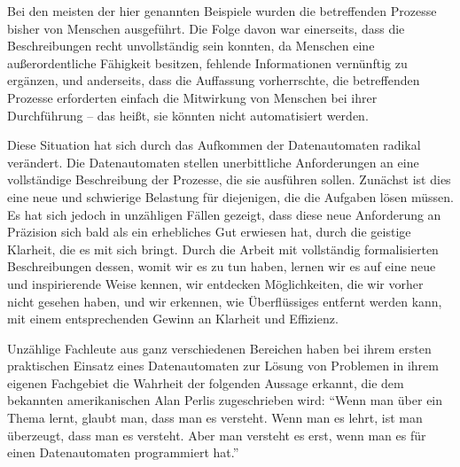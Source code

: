 {Bei den meisten der hier genannten Beispiele wurden die betreffenden Prozesse bisher von Menschen ausgeführt. Die Folge davon war einerseits, dass die Beschreibungen recht unvollständig sein konnten, da Menschen eine außerordentliche Fähigkeit besitzen, fehlende Informationen vernünftig zu ergänzen, und anderseits, dass die Auffassung vorherrschte, die betreffenden Prozesse erforderten einfach die Mitwirkung von Menschen bei ihrer Durchführung -- das heißt, sie könnten nicht automatisiert werden.

Diese Situation hat sich durch das Aufkommen der Datenautomaten radikal verändert. Die Datenautomaten stellen unerbittliche Anforderungen an eine vollständige Beschreibung der Prozesse, die sie ausführen sollen. Zunächst ist dies eine neue und schwierige Belastung für diejenigen, die die Aufgaben lösen müssen. Es hat sich jedoch in unzähligen Fällen gezeigt, dass diese neue Anforderung an Präzision sich bald als ein erhebliches Gut erwiesen hat, durch die geistige Klarheit, die es mit sich bringt. Durch die Arbeit mit vollständig formalisierten Beschreibungen dessen, womit wir es zu tun haben, lernen wir es auf eine neue und inspirierende Weise kennen, wir entdecken Möglichkeiten, die wir vorher nicht gesehen haben, und wir erkennen, wie Überflüssiges entfernt werden kann, mit einem entsprechenden Gewinn an Klarheit und Effizienz.

Unzählige Fachleute aus ganz verschiedenen Bereichen haben bei ihrem ersten praktischen Einsatz eines Datenautomaten zur Lösung von Problemen in ihrem eigenen Fachgebiet die Wahrheit der folgenden Aussage erkannt, die dem bekannten amerikanischen  Alan Perlis zugeschrieben wird: \enquote{Wenn man über ein Thema lernt, glaubt man, dass man es versteht. Wenn man es lehrt, ist man überzeugt, dass man es versteht. Aber man versteht es erst, wenn man es für einen Datenautomaten programmiert hat.}
}


